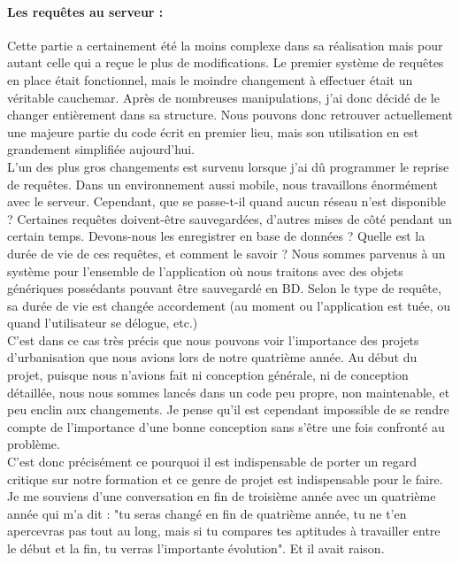 \documentclass{article}
\begin{document}
		\paragraph{Les requêtes au serveur :}
		Cette partie a certainement été la moins complexe dans sa réalisation mais pour autant celle qui a  reçue le plus de modifications. Le premier système de requêtes en place était fonctionnel, mais le moindre changement à effectuer était un véritable cauchemar. Après de nombreuses manipulations, j'ai donc décidé de le changer entièrement dans sa structure. Nous pouvons donc retrouver actuellement une majeure partie du code écrit en premier lieu, mais son utilisation en est grandement simplifiée aujourd'hui.\\
		
		L'un des plus gros changements est survenu lorsque j'ai dû programmer le reprise de requêtes. Dans un environnement aussi mobile, nous travaillons énormément avec le serveur. Cependant, que se passe-t-il quand aucun réseau n'est disponible ? Certaines requêtes doivent-être sauvegardées, d'autres mises de côté pendant un certain temps. Devons-nous les enregistrer en base de données ? Quelle est la durée de vie de ces requêtes, et comment le savoir ? Nous sommes parvenus à un système pour l'ensemble de l'application où nous traitons avec des objets génériques possédants pouvant être sauvegardé en BD. Selon le type de requête, sa durée de vie est changée accordement (au moment ou l'application est tuée, ou quand l'utilisateur se délogue, etc.)  	\\
		
		C'est dans ce cas très précis que nous pouvons voir l'importance des projets d'urbanisation que nous avions lors de notre quatrième année. Au début du projet, puisque nous n'avions fait ni conception générale, ni de conception détaillée, nous nous sommes lancés dans un code peu propre, non maintenable, et peu enclin aux changements. Je pense qu'il est cependant impossible de se rendre compte de l'importance d'une bonne conception sans s'être une fois confronté au problème. \\
		
		C'est donc précisément ce pourquoi il est indispensable de porter un regard critique sur notre formation et ce genre de projet est indispensable pour le faire. Je me souviens d'une conversation en fin de troisième année avec un quatrième année qui m'a dit : "tu seras changé en fin de quatrième année, tu ne t'en apercevras pas tout au long, mais si tu compares tes aptitudes à travailler entre le début et la fin, tu verras l'importante évolution". Et il avait raison.\\
				
\end{document}
